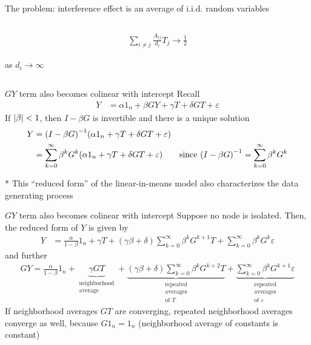 \documentclass[aspectratio=169]{beamer}
\theoremstyle{remark}
\begin{document}
\begin{frame}{The problem: interference effect is an average of i.i.d. random variables}
\begin{columns}
\begin{column}{0.4\textwidth}
            \begin{align*}
                \sum_{i \neq j} \frac{A_{ij}}{d_i} T_j \to \frac 12                       
            \end{align*}
            
            as $d_i \to \infty$
        \end{column}
    \end{columns}
\end{frame}


\begin{frame}{$GY$ term also becomes colinear with intercept}
    Recall
    \begin{align*}
        Y & = \alpha 1_n + \beta G Y + \gamma T + \delta G T + \varepsilon
    \end{align*}
    If $\lvert\beta\rvert < 1$, then $I - \beta G$ is invertible and there is a unique solution 
    \begin{align*}
        Y & = \paren*{I - \beta G}^{-1} \paren*{\alpha 1_n + \gamma T + \delta G T + \varepsilon}                                                                                \\
          & = \sum_{k=0}^\infty \beta^k G^k \paren*{\alpha 1_n + \gamma T + \delta G T + \varepsilon} & \text{since } \paren*{I - \beta G}^{-1} = \sum_{k=0}^\infty \beta^k G^k
    \end{align*}
    
    * This ``reduced form'' of the linear-in-means model also characterizes the data generating process
\end{frame}

\begin{frame}{$GY$ term also becomes colinear with intercept}
    Suppose no node is isolated. Then, the reduced form of $Y$ is given by
    \begin{align*}
        Y & = \frac{\alpha}{1 - \beta} 1_n  + \gamma T + (\gamma \beta + \delta) \sum_{k=0}^\infty \beta^k G^{k+1} T + \sum_{k=0}^\infty \beta^k G^k \varepsilon
    \end{align*}
    and further
    \begin{align*}
        GY = 
        \frac{\alpha}{1 - \beta} 1_n + 
        \underbrace{\gamma G T}_{\substack{\text{neighborhood}                                              \\ \text{average}}} + 
        \underbrace{(\gamma \beta + \delta) \sum_{k=0}^\infty \beta^k G^{k+2} T}_{\substack{\text{repeated} \\ \text{averages} \\ \text{of $T$}}} +
        \underbrace{\sum_{k=0}^\infty \beta^k G^{k+1} \varepsilon}_{\substack{\text{repeated}               \\ \text{averages} \\ \text{of $\varepsilon$}}}
    \end{align*}
    If neighborhood averages $GT$ are converging, repeated neighborhood averages converge as well, because $G 1_n = 1_n$ (neighborhood average of constants is constant)
\end{frame}
\end{document}
